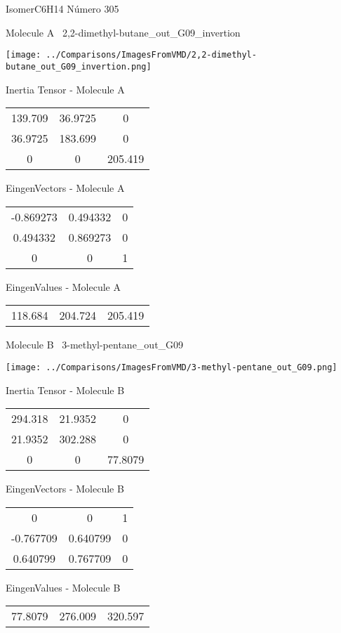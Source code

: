 \vtab[-3cm]
\begin{center}
{\large IsomerC6H14 \tab Número 305}
\end{center}
\begin{multicols}{2}
\begin{center}

Molecule A \
2,2-dimethyl-butane\_out\_G09\_invertion

\texttt{[image: ../Comparisons/ImagesFromVMD/2,2-dimethyl-butane\_out\_G09\_invertion.png]}

Inertia Tensor - Molecule A \\
\begin{tabular}{|c c c|}
139.709	 & 	36.9725	 & 	0	 \\
36.9725	 & 	183.699	 & 	0	 \\
0	 & 	0	 & 	205.419
\end{tabular}

\vtab
 EingenVectors - Molecule A     \\
\begin{tabular}{|c c c|}
-0.869273	 & 	0.494332	 & 	0	 \\
0.494332	 & 	0.869273	 & 	0	 \\
0	 & 	0	 & 	1
\end{tabular}

\vtab
 EingenValues - Molecule A     \\
\begin{tabular}{|c c c|}
118.684	 & 	204.724	 & 	205.419	 \\
\end{tabular}
\columnbreak

Molecule B \
3-methyl-pentane\_out\_G09

\texttt{[image: ../Comparisons/ImagesFromVMD/3-methyl-pentane\_out\_G09.png]}

Inertia Tensor - Molecule B \\
\begin{tabular}{|c c c|}
294.318	 & 	21.9352	 & 	0	 \\
21.9352	 & 	302.288	 & 	0	 \\
0	 & 	0	 & 	77.8079
\end{tabular}

\vtab
 EingenVectors - Molecule B     \\
\begin{tabular}{|c c c|}
0	 & 	0	 & 	1	 \\
-0.767709	 & 	0.640799	 & 	0	 \\
0.640799	 & 	0.767709	 & 	0
\end{tabular}

\vtab
 EingenValues - Molecule B     \\
\begin{tabular}{|c c c|}
77.8079	 & 	276.009	 & 	320.597	 \\
\end{tabular}

\end{center}
\end{multicols}

